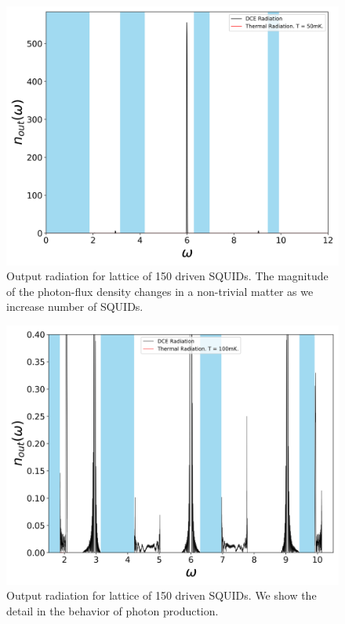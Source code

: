 \begin{figure}[h]
    \centering
    \includegraphics[width=\textwidth, keepaspectratio]{figures/results/150_SQUIDs_active.png}
    \caption{Output radiation for lattice of 150 driven SQUIDs. The magnitude of the photon-flux density changes in a non-trivial matter as we increase number of SQUIDs.}
    \label{fig:150_SQUIDs_active}
\end{figure}
\clearpage
%
%
\begin{figure}[h]
    \centering
    \includegraphics[width=\textwidth, keepaspectratio]{figures/results/150_SQUIDs_active_100mK_zoom.png}
    \caption{Output radiation for lattice of 150 driven SQUIDs. We show the detail in the behavior of photon production.}
    \label{fig:150_SQUIDs_active_zoomed}
\end{figure}
\clearpage
%

